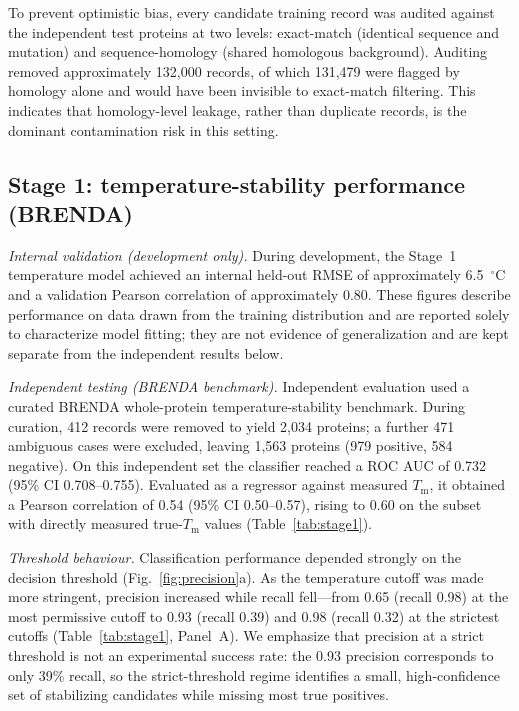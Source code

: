 \documentclass[11pt]{article}
\newcommand{\Tm}{\ensuremath{T_\mathrm{m}}}
\newcommand{\degC}{\ensuremath{^{\circ}}C}
\begin{document}
To prevent optimistic bias, every candidate training record was audited against the independent
test proteins at two levels: exact-match (identical sequence and mutation) and sequence-homology
(shared homologous background). Auditing removed approximately 132{,}000 records, of which
131{,}479 were flagged by homology alone and would have been invisible to exact-match filtering.
This indicates that homology-level leakage, rather than duplicate records, is the dominant
contamination risk in this setting.

\subsection{Stage 1: temperature-stability performance (BRENDA)}
\textit{Internal validation (development only).} During development, the Stage~1 temperature
model achieved an internal held-out RMSE of approximately 6.5~\degC{} and a validation Pearson
correlation of approximately 0.80. These figures describe performance on data drawn from the
training distribution and are reported solely to characterize model fitting; they are not
evidence of generalization and are kept separate from the independent results below.

\textit{Independent testing (BRENDA benchmark).} Independent evaluation used a curated BRENDA
whole-protein temperature-stability benchmark. During curation, 412 records were removed to yield
2{,}034 proteins; a further 471 ambiguous cases were excluded, leaving 1{,}563 proteins (979
positive, 584 negative). On this independent set the classifier reached a ROC AUC of 0.732 (95\%
CI 0.708--0.755). Evaluated as a regressor against measured \Tm, it obtained a Pearson
correlation of 0.54 (95\% CI 0.50--0.57), rising to 0.60 on the subset with directly measured
true-\Tm{} values (Table~\ref{tab:stage1}).

\textit{Threshold behaviour.} Classification performance depended strongly on the decision
threshold (Fig.~\ref{fig:precision}a). As the temperature cutoff was made more stringent,
precision increased while recall fell---from 0.65 (recall 0.98) at the most permissive cutoff to
0.93 (recall 0.39) and 0.98 (recall 0.32) at the strictest cutoffs (Table~\ref{tab:stage1},
Panel~A). We emphasize that precision at a strict threshold is not an experimental success rate:
the 0.93 precision corresponds to only 39\% recall, so the strict-threshold regime identifies a
small, high-confidence set of stabilizing candidates while missing most true positives.
\end{document}
